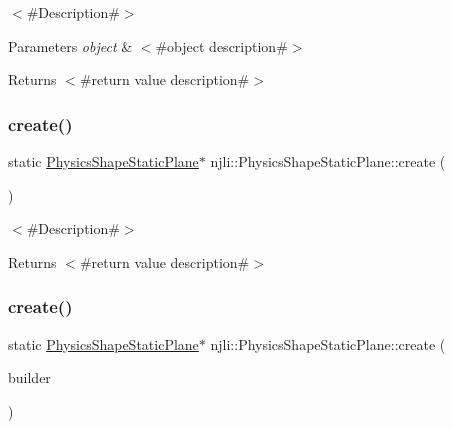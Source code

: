 $<$\#\+Description\#$>$


\begin{DoxyParams}{Parameters}
{\em object} & $<$\#object description\#$>$\\
\hline
\end{DoxyParams}
\begin{DoxyReturn}{Returns}
$<$\#return value description\#$>$ 
\end{DoxyReturn}
\mbox{\label{classnjli_1_1_physics_shape_static_plane_a79a084c8eae9c46259e7a16161a1dca6}} 
\subsubsection{\texorpdfstring{create()}{create()}\hspace{0.1cm}{\footnotesize\ttfamily [1/2]}}
{\footnotesize\ttfamily static \mbox{\hyperlink{classnjli_1_1_physics_shape_static_plane}{Physics\+Shape\+Static\+Plane}}$\ast$ njli\+::\+Physics\+Shape\+Static\+Plane\+::create (\begin{DoxyParamCaption}{ }\end{DoxyParamCaption})\hspace{0.3cm}{\ttfamily [static]}}

$<$\#\+Description\#$>$

\begin{DoxyReturn}{Returns}
$<$\#return value description\#$>$ 
\end{DoxyReturn}
\mbox{\label{classnjli_1_1_physics_shape_static_plane_a8a350cc452c42731f47a41ff0c917fda}} 
\subsubsection{\texorpdfstring{create()}{create()}\hspace{0.1cm}{\footnotesize\ttfamily [2/2]}}
{\footnotesize\ttfamily static \mbox{\hyperlink{classnjli_1_1_physics_shape_static_plane}{Physics\+Shape\+Static\+Plane}}$\ast$ njli\+::\+Physics\+Shape\+Static\+Plane\+::create (\begin{DoxyParamCaption}\item[{const \mbox{\hyperlink{classnjli_1_1_physics_shape_static_plane_builder}{Physics\+Shape\+Static\+Plane\+Builder}} \&}]{builder }\end{DoxyParamCaption})\hspace{0.3cm}{\ttfamily [static]}}

